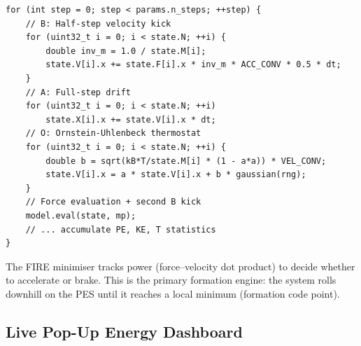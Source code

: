 \documentclass[11pt,a4paper]{article}
\begin{document}
\begin{lstlisting}[style=cpp,title={\textbf{C++ --- BAOAB integration loop}}]
for (int step = 0; step < params.n_steps; ++step) {
    // B: Half-step velocity kick
    for (uint32_t i = 0; i < state.N; ++i) {
        double inv_m = 1.0 / state.M[i];
        state.V[i].x += state.F[i].x * inv_m * ACC_CONV * 0.5 * dt;
    }
    // A: Full-step drift
    for (uint32_t i = 0; i < state.N; ++i)
        state.X[i].x += state.V[i].x * dt;
    // O: Ornstein-Uhlenbeck thermostat
    for (uint32_t i = 0; i < state.N; ++i) {
        double b = sqrt(kB*T/state.M[i] * (1 - a*a)) * VEL_CONV;
        state.V[i].x = a * state.V[i].x + b * gaussian(rng);
    }
    // Force evaluation + second B kick
    model.eval(state, mp);
    // ... accumulate PE, KE, T statistics
}
\end{lstlisting}

The FIRE minimiser tracks power (force--velocity dot product) to decide
whether to accelerate or brake.  This is the primary formation engine:
the system rolls downhill on the PES until it reaches a local minimum
(formation code point).

\subsection{Live Pop-Up Energy Dashboard}
\end{document}

